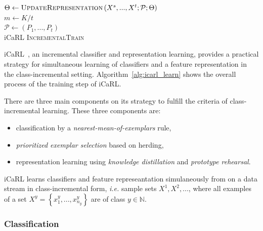 \begin{algorithm}[ht]
  $\Theta \leftarrow \textsc{UpdateRepresentation}\left(X^s, ..., X^t;\mathcal{P};\Theta\right)$ \\
  $m \leftarrow K/t$  \\
  $\mathcal{P} \leftarrow \left(P_1, ..., P_t\right)$  \\
\caption{ iCaRL \textsc{IncrementalTrain} \label{alg:icarl_learn}}
\end{algorithm}


iCaRL~\cite{Rebuffi:2016aa}, an incremental classifier and representation learning, provides a practical strategy for simultaneous learning of classifiers and a feature representation in the class-incremental setting. Algorithm~\ref{alg:icarl_learn} shows the overall process of the training step of iCaRL.

There are three main components on its strategy to fulfill the criteria of class-incremental learning. These three components are:

\begin{itemize}
  \item classification by a \textit{nearest-mean-of-exemplars} rule,
  \item \textit{prioritized exemplar selection} based on herding,
  \item representation learning using \textit{knowledge distillation} and \textit{prototype rehearsal}.
\end{itemize}

iCaRL learns classifiers and feature represeantation simulaneously from on a data stream in class-incremental form, \textit{i.e.} sample sets $X^1, X^2, ...$, where all examples of a set $X^y = \left\{ x_1^y, ..., x_{n_y}^y \right\}$ are of class $y \in \mathbb{N}$.

\subsubsection{Classification}
\label{sec:icarl_classification}

